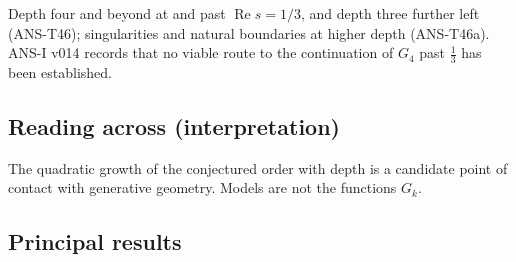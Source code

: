 \documentclass[
  11pt,
]{article}
\begin{document}
Depth four and beyond at and past \(\operatorname{Re}s=1/3\), and depth
three further left (ANS-T46); singularities and natural boundaries at
higher depth (ANS-T46a). ANS-I v014 records that no viable route to the
continuation of \(G_4\) past \(\frac13\) has been established.

\hypertarget{reading-across-interpretation-7}{%
\subsection{Reading across
(interpretation)}\label{reading-across-interpretation-7}}

The quadratic growth of the conjectured order with depth is a candidate
point of contact with generative geometry. Models are not the functions
\(G_k\).

\hypertarget{principal-results-7}{%
\subsection{Principal results}\label{principal-results-7}}
\end{document}
